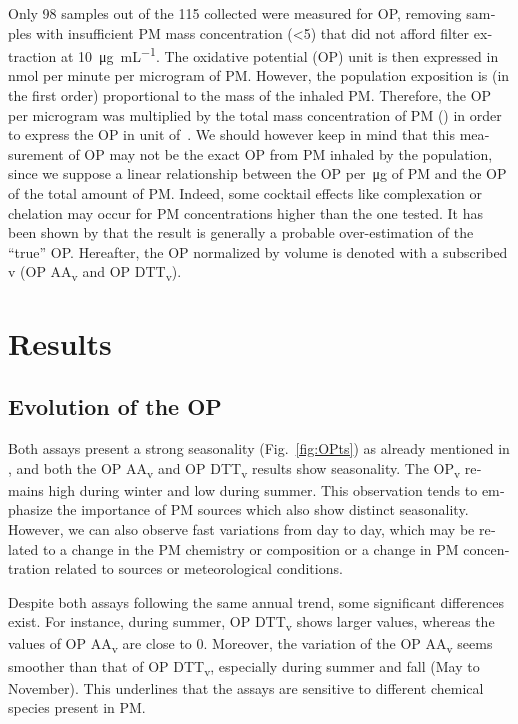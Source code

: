 \begin{otherlanguage}{english}
Only 98 samples out of the 115 collected were measured for OP, removing samples
with insufficient PM mass concentration (\SI{<5}{\ugm}) that
did not afford filter extraction at \SI{10}{\micro\g\per\milli\liter}. The oxidative
potential (OP) unit is then expressed in nmol per minute per microgram of PM.
However, the population exposition is (in the first order) proportional to the
mass of the inhaled PM. Therefore, the OP per microgram was multiplied by the
total mass concentration of PM (\si{\ugm}) in order to express the OP
in unit of~\si{\opv}. We should however keep in mind that this
measurement of OP may not be the exact OP from PM inhaled by the population,
since we suppose a linear relationship between the OP per~\si{\micro\g} of PM and
the OP of the total amount of PM. Indeed, some cocktail effects like
complexation or chelation may occur for PM concentrations higher than the one
tested. It has been shown by \textcite{calasImportance2017} that the result is
generally a probable over-estimation of the ``true'' OP. Hereafter, the OP
normalized by volume is denoted with a subscribed v (OP AA\textsubscript{v} and
OP DTT\textsubscript{v}).

\section{Results}\label{results}

\subsection{Evolution of the OP}\label{evolution-of-the-op}

Both assays present a strong seasonality (Fig.~\ref{fig:OPts}) as already
mentioned in \textcite{calasImportance2017}, and both the OP AA\textsubscript{v}
and OP DTT\textsubscript{v} results show seasonality. The OP\textsubscript{v}
remains high during winter and low during summer.  This observation tends to
emphasize the importance of PM sources which also show distinct seasonality.
However, we can also observe fast variations from day to day, which may be
related to a change in the PM chemistry or composition or a change in PM concentration
related to sources or meteorological conditions.

Despite both assays following the same annual trend, some significant
differences exist. For instance, during summer, OP DTT\textsubscript{v} shows
larger values, whereas the values of OP AA\textsubscript{v} are close to 0.
Moreover, the variation of the OP AA\textsubscript{v} seems smoother than that
of OP DTT\textsubscript{v}, especially during summer and fall (May to November). 
This underlines that the assays are sensitive to different chemical species
present in PM.


\end{otherlanguage}
